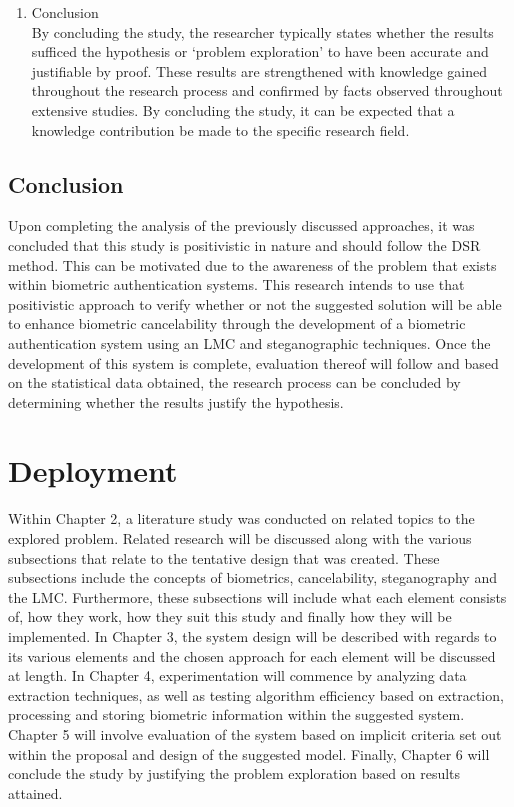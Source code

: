 \begin{enumerate}[label=\roman*.]
	\item Conclusion \\\vspace{4mm}
	By concluding the study, the researcher typically states whether the results sufficed the hypothesis or ‘problem exploration’ to have been accurate and justifiable by proof. These results are strengthened with knowledge gained throughout the research process and confirmed by facts observed throughout extensive studies. By concluding the study, it can be expected that a knowledge contribution be made to the specific research field.
\end{enumerate}

\subsection{Conclusion}
Upon completing the analysis of the previously discussed approaches, it was concluded that this study is positivistic in nature and should follow the DSR method. This can be motivated due to the awareness of the problem that exists within biometric authentication systems. This research intends to use that positivistic approach to verify whether or not the suggested solution will be able to enhance biometric cancelability through the development of a biometric authentication system using an LMC and steganographic techniques. Once the development of this system is complete, evaluation thereof will follow and based on the statistical data obtained, the research process can be concluded by determining whether the results justify the hypothesis.

\section{Deployment}  %
\label{section1.6}
Within Chapter 2, a literature study was conducted on related topics to the explored problem. Related research will be discussed along with the various subsections that relate to the tentative design that was created. These subsections include the concepts of biometrics, cancelability, steganography and the LMC. Furthermore, these subsections will include what each element consists of, how they work, how they suit this study and finally how they will be implemented.
In Chapter 3, the system design will be described with regards to its various elements and the chosen approach for each element will be discussed at length.
In Chapter 4, experimentation will commence by analyzing data extraction techniques, as well as testing algorithm efficiency based on extraction, processing and storing biometric information within the suggested system.
Chapter 5 will involve evaluation of the system based on implicit criteria set out within the proposal and design of the suggested model.
Finally, Chapter 6 will conclude the study by justifying the problem exploration based on results attained.

